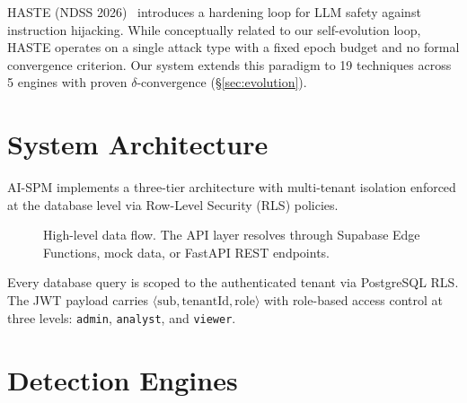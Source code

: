 \documentclass[11pt,twocolumn]{article}
\begin{document}
HASTE (NDSS 2026)~\cite{haste} introduces a hardening loop for LLM safety against instruction hijacking. While conceptually related to our self-evolution loop, HASTE operates on a single attack type with a fixed epoch budget and no formal convergence criterion. Our system extends this paradigm to 19 techniques across 5 engines with proven $\delta$-convergence (\S\ref{sec:evolution}).

\section{System Architecture}
\label{sec:arch}

AI-SPM implements a three-tier architecture with multi-tenant isolation enforced at the database level via Row-Level Security (RLS) policies.

\begin{figure}[h]
\centering
{}
\caption{High-level data flow. The API layer resolves through Supabase Edge Functions, mock data, or FastAPI REST endpoints.}
\label{fig:arch}
\end{figure}

Every database query is scoped to the authenticated tenant via PostgreSQL RLS. The JWT payload carries $\langle \text{sub}, \text{tenantId}, \text{role} \rangle$ with role-based access control at three levels: \texttt{admin}, \texttt{analyst}, and \texttt{viewer}.

\section{Detection Engines}
\label{sec:engines}
\end{document}
